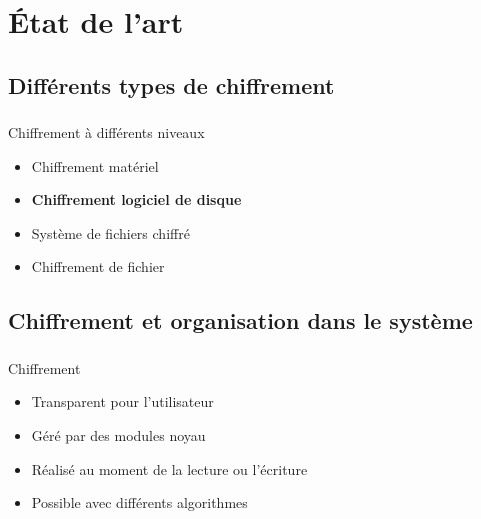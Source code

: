\section{État de l'art}

\subsection{Différents types de chiffrement}

\begin{frame}
  \frametitle{\insertsubsectionhead}
  \pause
  \begin{block}{Chiffrement à différents niveaux}
    \begin{itemize}
      \pause
    \item Chiffrement matériel
      \pause
    \item \textbf{Chiffrement logiciel de disque}
      \pause
    \item Système de fichiers chiffré
      \pause
    \item Chiffrement de fichier
    \end{itemize}
  \end{block}
\end{frame}

\subsection{Chiffrement et organisation dans le système}

\begin{frame}
  \frametitle{\insertsubsectionhead}
  \pause
  \begin{block}{Chiffrement}
    \begin{itemize}
      \pause
    \item Transparent pour l'utilisateur
    \item Géré par des modules noyau
    \item Réalisé au moment de la lecture ou l'écriture
    \item Possible avec différents algorithmes
    \end{itemize}
  \end{block}
\end{frame}


